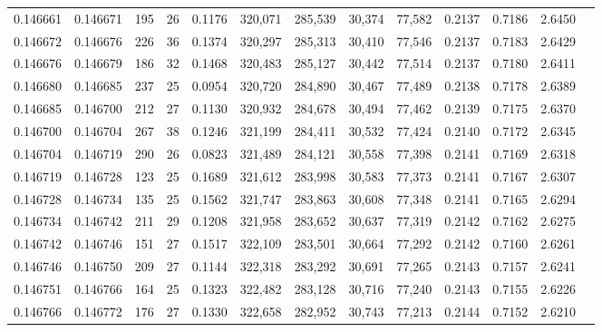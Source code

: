 \begin{tabular}{rrrrrrrrrrrrr}
0.146661 & 0.146671 & 195 &  26 &                                     0.1176 & 320,071 & 285,539 &  30,374 &  77,582 & 0.2137 & 0.7186 & 2.6450 \\
0.146672 & 0.146676 & 226 &  36 &                                     0.1374 & 320,297 & 285,313 &  30,410 &  77,546 & 0.2137 & 0.7183 & 2.6429 \\
0.146676 & 0.146679 & 186 &  32 &                                     0.1468 & 320,483 & 285,127 &  30,442 &  77,514 & 0.2137 & 0.7180 & 2.6411 \\
0.146680 & 0.146685 & 237 &  25 &                                     0.0954 & 320,720 & 284,890 &  30,467 &  77,489 & 0.2138 & 0.7178 & 2.6389 \\
0.146685 & 0.146700 & 212 &  27 &                                     0.1130 & 320,932 & 284,678 &  30,494 &  77,462 & 0.2139 & 0.7175 & 2.6370 \\
0.146700 & 0.146704 & 267 &  38 &                                     0.1246 & 321,199 & 284,411 &  30,532 &  77,424 & 0.2140 & 0.7172 & 2.6345 \\
0.146704 & 0.146719 & 290 &  26 &                                     0.0823 & 321,489 & 284,121 &  30,558 &  77,398 & 0.2141 & 0.7169 & 2.6318 \\
0.146719 & 0.146728 & 123 &  25 &                                     0.1689 & 321,612 & 283,998 &  30,583 &  77,373 & 0.2141 & 0.7167 & 2.6307 \\
0.146728 & 0.146734 & 135 &  25 &                                     0.1562 & 321,747 & 283,863 &  30,608 &  77,348 & 0.2141 & 0.7165 & 2.6294 \\
0.146734 & 0.146742 & 211 &  29 &                                     0.1208 & 321,958 & 283,652 &  30,637 &  77,319 & 0.2142 & 0.7162 & 2.6275 \\
0.146742 & 0.146746 & 151 &  27 &                                     0.1517 & 322,109 & 283,501 &  30,664 &  77,292 & 0.2142 & 0.7160 & 2.6261 \\
0.146746 & 0.146750 & 209 &  27 &                                     0.1144 & 322,318 & 283,292 &  30,691 &  77,265 & 0.2143 & 0.7157 & 2.6241 \\
0.146751 & 0.146766 & 164 &  25 &                                     0.1323 & 322,482 & 283,128 &  30,716 &  77,240 & 0.2143 & 0.7155 & 2.6226 \\
0.146766 & 0.146772 & 176 &  27 &                                     0.1330 & 322,658 & 282,952 &  30,743 &  77,213 & 0.2144 & 0.7152 & 2.6210 \\

\end{tabular}
